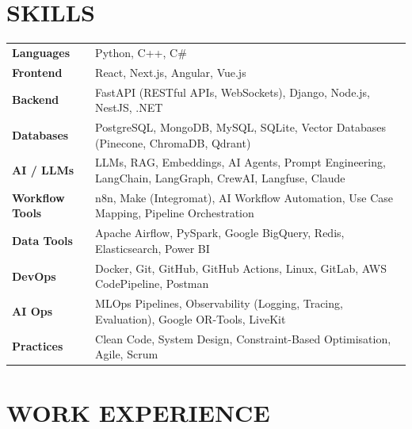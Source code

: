 \documentclass[letterpaper,10pt]{article}
\begin{document}
  \section{SKILLS}
\begin{tabular}{ l @{\hspace{0.5cm}} l }
  \textbf{Languages} & Python, C++, C\#\\
  \textbf{Frontend} & React, Next.js, Angular, Vue.js\\
  \textbf{Backend} & FastAPI (RESTful APIs, WebSockets), Django, Node.js, NestJS, .NET \\
  \textbf{Databases} & PostgreSQL, MongoDB, MySQL, SQLite, Vector Databases (Pinecone, ChromaDB, Qdrant) \\
  \textbf{AI / LLMs} & LLMs, RAG, Embeddings, AI Agents, Prompt Engineering, LangChain, LangGraph, CrewAI, Langfuse, Claude \\
  \textbf{Workflow Tools} & n8n, Make (Integromat), AI Workflow Automation, Use Case Mapping, Pipeline Orchestration \\
  \textbf{Data Tools} & Apache Airflow, PySpark, Google BigQuery, Redis, Elasticsearch, Power BI \\
  \textbf{DevOps} & Docker, Git, GitHub, GitHub Actions, Linux, GitLab, AWS CodePipeline, Postman \\
  \textbf{AI Ops} & MLOps Pipelines, Observability (Logging, Tracing, Evaluation), Google OR-Tools, LiveKit \\
  \textbf{Practices} & Clean Code, System Design, Constraint-Based Optimisation, Agile, Scrum \\
\end{tabular}



  \section{WORK EXPERIENCE}
\end{document}
